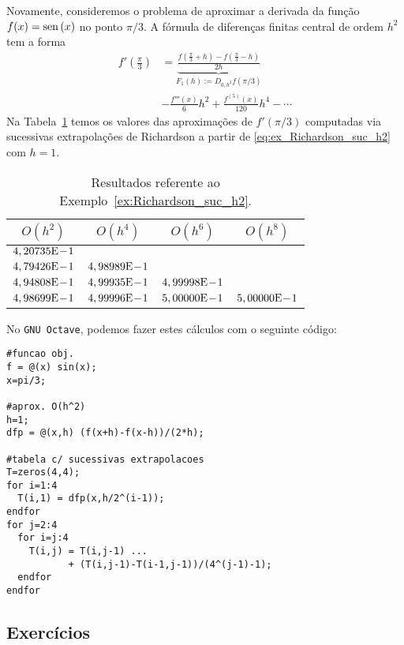 \begin{ex}\label{ex:Richardson_suc_h2}
  Novamente, consideremos o problema de aproximar a derivada da função $f(x) = \operatorname{sen}\,(x)$ no ponto $\pi/3$. A fórmula de diferenças finitas central de ordem $h^2$ tem a forma
  \begin{align}
    f'\left(\frac{\pi}{3}\right) &= \underbrace{\frac{f\left(\frac{\pi}{3}+h\right)-f\left(\frac{\pi}{3}-h\right)}{2h}}_{F_1(h) := D_{0,h^2}f(\pi/3)} \nonumber\\
          &- \frac{f'''(x)}{6}h^2 + \frac{f^{(5)}(x)}{120}h^4 - \cdots \label{eq:ex_Richardson_suc_h2}
  \end{align}
Na Tabela~\ref{tab:ex_Richardson_suc_h2} temos os valores das aproximações de $f'(\pi/3)$ computadas via sucessivas extrapolações de Richardson a partir de \eqref{eq:ex_Richardson_suc_h2} com $h=1$.

\begin{table}[h!]
  \centering
  \caption{Resultados referente ao Exemplo~\ref{ex:Richardson_suc_h2}.}
  \begin{tabular}{cccc}\hline
    $O(h^2)$ & $O(h^4)$ & $O(h^6)$ & $O(h^8)$\\ \hline
    $4,20735\mathrm{E}\!-\!1$ \\
    $4,79426\mathrm{E}\!-\!1$ & $4,98989\mathrm{E}\!-\!1$ \\
    $4,94808\mathrm{E}\!-\!1$ & $4,99935\mathrm{E}\!-\!1$ & $4,99998\mathrm{E}\!-\!1$ \\
    $4,98699\mathrm{E}\!-\!1$ & $4,99996\mathrm{E}\!-\!1$ & $5,00000\mathrm{E}\!-\!1$ & $5,00000\mathrm{E}\!-\!1$ \\\hline
  \end{tabular}
  \label{tab:ex_Richardson_suc_h2}
\end{table}

No \verb+GNU Octave+, podemos fazer estes cálculos com o seguinte código:
\begin{verbatim}
#funcao obj.
f = @(x) sin(x);
x=pi/3;

#aprox. O(h^2)
h=1;
dfp = @(x,h) (f(x+h)-f(x-h))/(2*h);

#tabela c/ sucessivas extrapolacoes
T=zeros(4,4);
for i=1:4
  T(i,1) = dfp(x,h/2^(i-1));
endfor
for j=2:4
  for i=j:4
    T(i,j) = T(i,j-1) ... 
           + (T(i,j-1)-T(i-1,j-1))/(4^(j-1)-1);
  endfor
endfor
\end{verbatim}
\end{ex}

\subsection{Exercícios}

